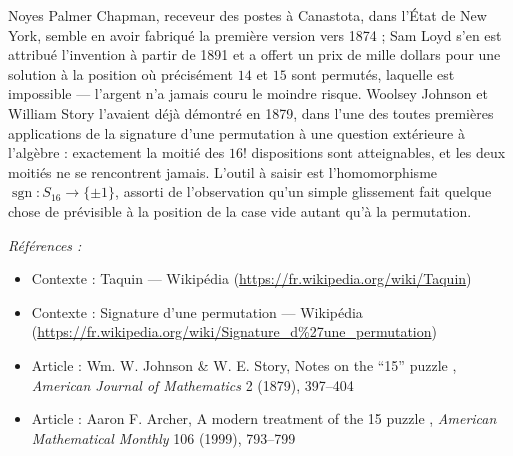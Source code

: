 \documentclass[11pt]{article}
\newenvironment{refs}{\par\small\noindent\emph{Références :}\begin{itemize}\setlength\itemsep{0pt}}{\end{itemize}\normalsize}
\begin{document}
\noindent Noyes Palmer Chapman, receveur des postes à Canastota, dans l'État de New
York, semble en avoir fabriqué la première version vers 1874 ; Sam Loyd s'en est attribué
l'invention à partir de 1891 et a offert un prix de mille dollars pour une solution à la
position où précisément $ 14 $ et $ 15 $ sont permutés, laquelle est impossible ---
l'argent n'a jamais couru le moindre risque. Woolsey Johnson et William Story l'avaient déjà
démontré en 1879, dans l'une des toutes premières applications de la signature d'une
permutation à une question extérieure à l'algèbre : exactement la moitié des $ 16! $
dispositions sont atteignables, et les deux moitiés ne se rencontrent jamais. L'outil à
saisir est l'homomorphisme $ \operatorname{sgn} : S_{16} \to \{\pm 1\} $, assorti de
l'observation qu'un simple glissement fait quelque chose de prévisible à la position de la
case vide autant qu'à la permutation.

\begin{refs}
\item Contexte : Taquin --- Wikipédia (\url{https://fr.wikipedia.org/wiki/Taquin})
\item Contexte : Signature d'une permutation --- Wikipédia (\url{https://fr.wikipedia.org/wiki/Signature_d%27une_permutation})
\item Article : Wm. W. Johnson \& W. E. Story, \og{} Notes on the ``15'' puzzle \fg{}, \textit{American Journal of Mathematics} 2 (1879), 397--404
\item Article : Aaron F. Archer, \og{} A modern treatment of the 15 puzzle \fg{}, \textit{American Mathematical Monthly} 106 (1999), 793--799
\end{refs}

\bigskip
\end{document}
